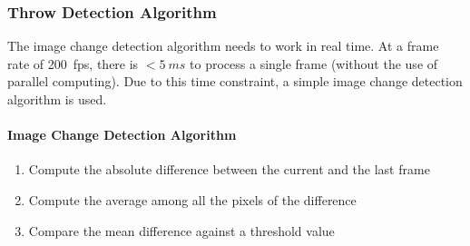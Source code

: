 \subsubsection{Throw Detection Algorithm}
\label{subsubsec:algorithm}




The image change detection algorithm needs to work in real time.
At a frame rate of \SI{200}{fps}, there is $<\SI{5}{ms}$ to process a single frame (without the use of parallel computing).
Due to this time constraint, a simple image change detection algorithm is used.

\paragraph{Image Change Detection Algorithm}
\vspace{-20pt}
\begin{enumerate}
  \item Compute the absolute difference between the current and the last frame
  \item Compute the average among all the pixels of the difference
  \item Compare the mean difference against a threshold value
\end{enumerate}

